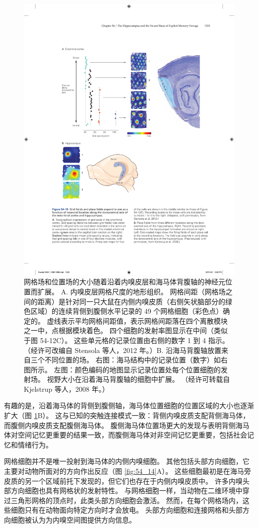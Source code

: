 \begin{figure}[htbp]
	\centering
	\includegraphics[width=0.8\linewidth]{chap54/fig_54_13}
	\caption{网格场和位置场的大小随着沿着内嗅皮层和海马体背腹轴的神经元位置而扩展。 A. 内嗅皮层网格尺度的地形组织。 网格间距（网格场之间的距离）是针对同一只大鼠在内侧内嗅皮质（右侧矢状脑部分的绿色区域）的连续背侧到腹侧水平记录的 49 个网格细胞（彩色点）确定的。 虚线表示平均网格间距值，表示网格间距落在四个离散模块之一中，点根据模块着色。 四个细胞的发射率图显示在中间（类似于图 54-12C）。 这些单元格的记录位置由右侧的数字 1 到 4 指示。 （经许可改编自 Stensola 等人，2012 年。）B. 沿海马背腹轴放置来自三个不同位置的场。 右图：海马结构中的记录位置（数字）如右图所示。 左图：颜色编码的地图显示记录位置处每个位置细胞的发射场。 视野大小在沿着海马背腹轴的细胞中扩展。 （经许可转载自 Kjelstrup 等人，2008 年。）}
	\label{fig:54_13}
\end{figure}


有趣的是，沿着海马体的背侧到腹侧轴，海马体位置细胞的位置区域的大小也逐渐扩大（图 \ref{fig:54_13}B）。
这与已知的突触连接模式一致：背侧内嗅皮质支配背侧海马体，而腹侧内嗅皮质支配腹侧海马体。
腹侧海马体位置场更大的发现与表明背侧海马体对空间记忆更重要的结果一致，而腹侧海马体对非空间记忆更重要，包括社会记忆和情绪行为。


网格细胞并不是唯一投射到海马体的内侧内嗅细胞。
其他包括头部方向细胞，它主要对动物所面对的方向作出反应（图 \ref{fig:54_14}A）。
这些细胞最初是在海马旁皮质的另一个区域前托下发现的，但它们也存在于内侧内嗅皮质中。
许多内嗅头部方向细胞也具有网格状的发射特性。
与网格细胞一样，当动物在二维环境中穿过三角形网格的顶点时，此类头部方向细胞会激活。
然而，在每个网格场内，这些细胞只有在动物面向特定方向时才会放电。
头部方向细胞和连接网格和头部方向细胞被认为为内嗅空间图提供方向信息。


